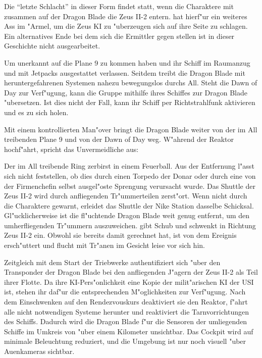 
Die ``letzte Schlacht'' in dieser Form findet statt, wenn die Charaktere mit \xl{} zusammen auf der Dragon Blade die Zeus II-2 entern. \xl{} hat hierf"ur ein weiteres Ass im "Armel, um die Zeus KI zu "uberzeugen sich auf ihre Seite zu schlagen. Ein alternatives Ende bei dem sich die Ermittler gegen \xl{} stellen ist in dieser Geschichte nicht ausgearbeitet.

Um unerkannt auf die Plane 9 zu kommen haben \xl{} und \ml{} ihr Schiff im Raumanzug und mit Jetpacks ausgestattet verlassen. Seitdem treibt die Dragon Blade mit heruntergefahrenen Systemen nahezu bewegungslos durchs All. Steht die Dawn of Day zur Verf"ugung, kann die Gruppe mithilfe ihres Schiffes zur Dragon Blade "ubersetzen. Ist dies nicht der Fall, kann \xl{} ihr Schiff per Richtstrahlfunk aktivieren und es zu sich holen.

Mit einem kontrollierten Man"over bringt \xl{} die Dragon Blade weiter von der im All treibenden Plane 9 und von der Dawn of Day weg. W"ahrend der Reaktor hochf"ahrt, spricht \xl{} das Unvermeidliche aus:


Der im All treibende Ring zerbirst in einem Feuerball. Aus der Entfernung l"asst sich nicht feststellen, ob dies durch einen Torpedo der Donar oder durch eine von der Firmenchefin selbst ausgel"oste Sprengung verursacht wurde. Das Shuttle der Zeus II-2 wird durch anfliegenden Tr"ummerteilen zerst"ort. Wenn nicht durch die Charaktere gewarnt, erleidet das Shuttle der Nike Station dasselbe Schicksal. Gl"ucklicherweise ist die fl"uchtende Dragon Blade weit genug entfernt, um den umherfliegenden Tr"ummern auszuweichen. \xl{} gibt Schub und schwenkt in Richtung Zeus II-2 ein. Obwohl sie bereits damit gerechnet hat, ist \ml{} von dem Ereignis ersch"uttert und flucht mit Tr"anen im Gesicht leise vor sich hin.

Zeitgleich mit dem Start der Triebwerke authentifiziert sich \xl{} "uber den Transponder der Dragon Blade bei den anfliegenden J"agern der Zeus II-2 als Teil ihrer Flotte. Da ihre KI-Pers"onlichkeit eine Kopie der milit"arischen KI der USI ist, stehen ihr daf"ur die entsprechenden M"oglichkeiten zur Verf"ugung. Nach dem Einschwenken auf den Rendezvouskurs deaktiviert sie den Reaktor, f"ahrt alle nicht notwendigen Systeme herunter und reaktiviert die Tarnvorrichtungen des Schiffs. Dadurch wird die Dragon Blade f"ur die Sensoren der umliegenden Schiffe im Umkreis von "uber einem Kilometer unsichtbar. Das Cockpit wird auf minimale Beleuchtung reduziert, und die Umgebung ist nur noch visuell "uber Au\3enkameras sichtbar.

